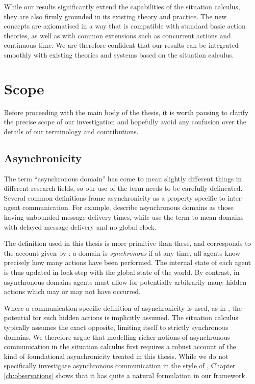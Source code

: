 While our results significantly extend the capabilities of the situation
calculus, they are also firmly grounded in its existing theory and
practice. The new concepts are axiomatised in a way that is compatible
with standard basic action theories, as well as with common extensions
such as concurrent actions and continuous time. We are therefore confident
that our results can be integrated smoothly with existing theories
and systems based on the situation calculus.


\section{Scope}

Before proceeding with the main body of the thesis, it is worth pausing
to clarify the precise scope of our investigation and hopefully avoid
any confusion over the details of our terminology and contributions.


\subsection{Asynchronicity}

The term {}``asynchronous domain'' has come to mean slightly different
things in different research fields, so our use of the term needs
to be carefully delineated. Several common definitions frame asynchronicity
as a property specific to inter-agent communication. For example,
\citet{fischer85distributed_consensus} describe asynchronous domains
as those having unbounded message delivery times, while \citet{halpern90knowledge_distrib}
use the term to mean domains with delayed message delivery and no
global clock.

The definition used in this thesis is more primitive than these, and
corresponds to the account given by \citet{vanBentham06tree_of_knowledge}:
a domain is \emph{synchronous} if at any time, all agents know precisely
how many actions have been performed. The internal state of each agent
is thus updated in lock-step with the global state of the world. By
contrast, in asynchronous domains agents must allow for potentially
arbitrarily-many hidden actions which may or may not have occurred.

Where a communication-specific definition of asynchronicity is used,
as in \citep{fischer85distributed_consensus,halpern90knowledge_distrib},
the potential for such hidden actions is implicitly assumed. The situation
calculus typically assumes the exact opposite, limiting itself to
strictly synchronous domains. We therefore argue that modelling richer
notions of asynchronous communication in the situation calculus first
requires a robust account of the kind of foundational asynchronicity
treated in this thesis. While we do not specifically investigate asynchronous
communication in the style of \citep{fischer85distributed_consensus,halpern90knowledge_distrib},
Chapter \ref{ch:observations} shows that it has quite a natural formulation
in our framework.


